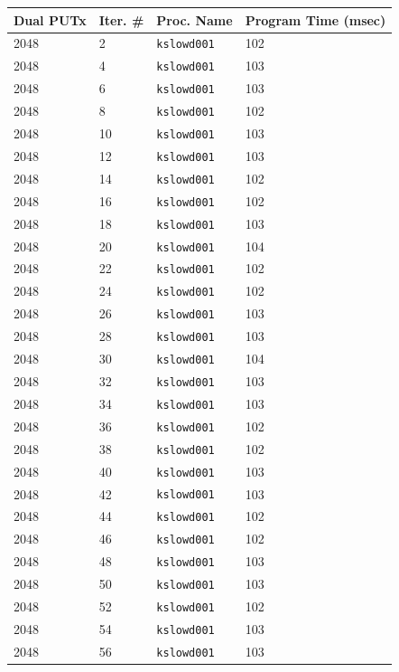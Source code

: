 \documentclass[10pt]{article}
\begin{document}
\begin{table}[htp!]
\centering
{
 \begin{tabular}{|l|l|l|l|} \hline
Dual PUTx & Iter. \# & Proc. Name & Program Time (msec)\\ \hline
2048 & 2 & {\tt kslowd001} & 102 \\ \hline
2048 & 4 & {\tt kslowd001} & 103 \\ \hline
2048 & 6 & {\tt kslowd001} & 103 \\ \hline
2048 & 8 & {\tt kslowd001} & 102 \\ \hline
2048 & 10 & {\tt kslowd001} & 103 \\ \hline
2048 & 12 & {\tt kslowd001} & 103 \\ \hline
2048 & 14 & {\tt kslowd001} & 102 \\ \hline
2048 & 16 & {\tt kslowd001} & 102 \\ \hline
2048 & 18 & {\tt kslowd001} & 103 \\ \hline
2048 & 20 & {\tt kslowd001} & 104 \\ \hline
2048 & 22 & {\tt kslowd001} & 102 \\ \hline
2048 & 24 & {\tt kslowd001} & 102 \\ \hline
2048 & 26 & {\tt kslowd001} & 103 \\ \hline
2048 & 28 & {\tt kslowd001} & 103 \\ \hline
2048 & 30 & {\tt kslowd001} & 104 \\ \hline
2048 & 32 & {\tt kslowd001} & 103 \\ \hline
2048 & 34 & {\tt kslowd001} & 103 \\ \hline
2048 & 36 & {\tt kslowd001} & 102 \\ \hline
2048 & 38 & {\tt kslowd001} & 102 \\ \hline
2048 & 40 & {\tt kslowd001} & 103 \\ \hline
2048 & 42 & {\tt kslowd001} & 103 \\ \hline
2048 & 44 & {\tt kslowd001} & 102 \\ \hline
2048 & 46 & {\tt kslowd001} & 102 \\ \hline
2048 & 48 & {\tt kslowd001} & 103 \\ \hline
2048 & 50 & {\tt kslowd001} & 103 \\ \hline
2048 & 52 & {\tt kslowd001} & 102 \\ \hline
2048 & 54 & {\tt kslowd001} & 103 \\ \hline
2048 & 56 & {\tt kslowd001} & 103 \\ \hline

\end{tabular}}
\end{table}
\end{document}

